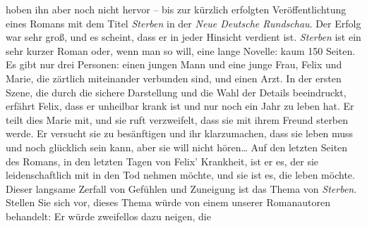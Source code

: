 \begin{ledgroupsized}[t]{13cm}
{{{{{                                 hoben ihn aber noch nicht hervor – bis zur kürzlich erfolgten
                                 Veröffentlichtung eines Romans mit dem Titel \emph{Sterben} in der \emph{Neue Deutsche Rundschau}. Der Erfolg war sehr groß, und es scheint, dass er in jeder
                                 Hinsicht verdient ist. \emph{Sterben} ist ein sehr kurzer Roman oder, wenn man so will, eine lange
                                 Novelle: kaum 150 Seiten. Es gibt nur drei Personen: einen jungen
                                 Mann und eine junge Frau, Felix und Marie, die zärtlich miteinander
                                 verbunden sind, und einen Arzt. In der ersten Szene, die durch die
                                 sichere Darstellung und die Wahl der Details beeindruckt, erfährt
                                 Felix, dass er unheilbar krank ist und nur noch ein Jahr zu leben
                                 hat. Er teilt dies Marie mit, und sie ruft verzweifelt, dass sie
                                 mit ihrem Freund sterben werde. Er versucht sie zu besänftigen und
                                 ihr klarzumachen, dass sie leben muss und noch glücklich sein kann,
                                 aber sie will nicht hören{\dots} Auf den
                                 letzten Seiten des Romans, in den letzten Tagen von Felix’
                                 Krankheit, ist er es, der sie leidenschaftlich mit in den Tod
                                 nehmen möchte, und sie ist es, die leben möchte. Dieser langsame
                                 Zerfall von Gefühlen und Zuneigung ist das Thema von \emph{Sterben}. Stellen Sie sich vor, dieses Thema würde von einem unserer
                                 Romanautoren behandelt: Er würde zweifellos dazu neigen, die
}}}}}
\end{ledgroupsized}

